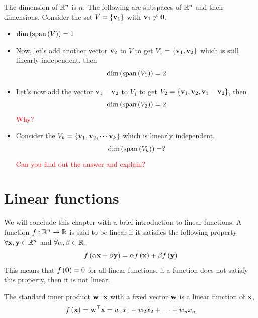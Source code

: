 \begin{boxedstuff}
    \begin{example}
        The dimension of $\mathbb{R}^n$ is $n$. The following are subspaces of $\mathbb{R}^n$ and their dimensions. Consider the set $V = \left\{ \mathbf{v}_1\right\}$ with $\mathbf{v}_1 \neq \mathbf{0}$.
        \begin{itemize}
            \item $\text{dim}\left( \text{span}\left( V\right)\right) = 1$ 
            \item Now, let's add another vector $\mathbf{v}_2$ to $V$ to get $V_1 = \left\{ \mathbf{v}_1, \mathbf{v}_2 \right\}$ which is still linearly independent, then
            \[ \text{dim}\left( \text{span}\left( V_1\right)\right) = 2 \]
            \item Let's now add the vector $\mathbf{v}_1 - \mathbf{v}_2$ to $V_1$ to get $V_2 = \left\{ \mathbf{v}_1, \mathbf{v}_2, \mathbf{v}_1 - \mathbf{v}_2 \right\}$, then
            \[ \text{dim}\left( \text{span}\left( V_2\right)\right) = 2 \] \textcolor{red}{Why?}
            \item Consider the $V_k = \left\{ \mathbf{v}_1, \mathbf{v}_2, \cdots \mathbf{v}_k \right\}$ which is linearly independent.
            \[ \text{dim}\left( \text{span}\left( V_k\right)\right) = ? \] \textcolor{red}{Can you find out the answer and explain?}
        \end{itemize}
    \end{example}
\end{boxedstuff}

\section{Linear functions}
We will conclude this chapter with a brief introduction to linear functions. A function $f: \mathbb{R}^n \to \mathbb{R}$ is said to be linear if it satisfies the following property $\forall \mathbf{x}, \mathbf{y} \in \mathbb{R}^n$ and $\forall \alpha, \beta \in \mathbb{R}$:
\begin{equation}
    f\left( \alpha \mathbf{x} + \beta \mathbf{y}\right) = \alpha f\left( \mathbf{x}\right) + \beta f\left( \mathbf{y}\right)
    \label{eq:linear-func-superpos}
\end{equation}
This means that $f\left( \mathbf{0}\right) = 0$ for all linear functions. if a function does not satisfy this property, then it is not linear.

The standard inner product $\mathbf{w}^\top\mathbf{x}$ with a fixed  vector $\mathbf{w}$ is a linear function of $\mathbf{x}$,
\[ f\left( \mathbf{x}\right) = \mathbf{w}^\top \mathbf{x} = w_1x_1 + w_2x_2 + \cdots + w_nx_n \]

